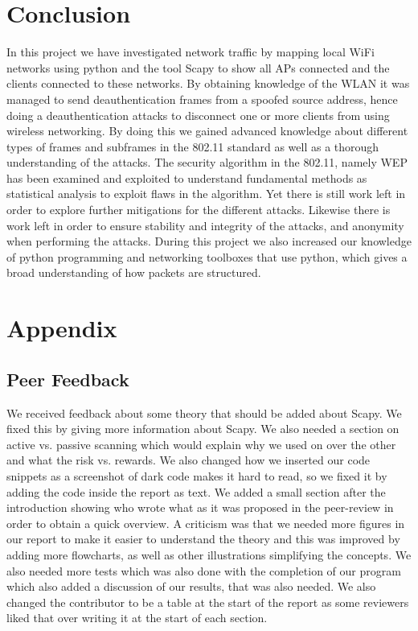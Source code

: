\section{Conclusion}
In this project we have investigated network traffic by mapping local WiFi networks using python and the tool Scapy to show all APs connected and the clients connected to these networks. By obtaining knowledge of the WLAN it was managed to send deauthentication frames from a spoofed source address, hence doing a deauthentication attacks to disconnect one or more clients from using wireless networking. By doing this we gained advanced knowledge about different types of frames and subframes in the 802.11 standard as well as a thorough understanding of the attacks. The security algorithm in the 802.11, namely WEP has been examined and exploited to understand fundamental methods as statistical analysis to exploit flaws in the algorithm. Yet there is still work left in order to explore further mitigations for the different attacks. Likewise there is work left in order to ensure stability and integrity of the attacks, and anonymity when performing the attacks.  
During this project we also increased our knowledge of python programming and networking toolboxes that use python, which gives a broad understanding of how packets are structured. 


\section{Appendix}

\subsection{Peer Feedback}
We received feedback about some theory that should be added about Scapy. We fixed this by giving more information about Scapy. We also needed a section on active vs. passive scanning which would explain why we used on over the other and what the risk vs. rewards. 
We also changed how we inserted our code snippets as a screenshot of dark code makes it hard to read, so we fixed it by adding the code inside the report as text. 
We added a small section after the introduction showing who wrote what as it was proposed in the peer-review in order to obtain a quick overview.
A criticism was that we needed more figures in our report to make it easier to understand the theory and this was improved by adding more flowcharts, as well as other illustrations simplifying the concepts. 
We also needed more tests which was also done with the completion of our program which also added a discussion of our results, that was also needed. 
We also changed the contributor to be a table at the start of the report as some reviewers liked that over writing it at the start of each section.

